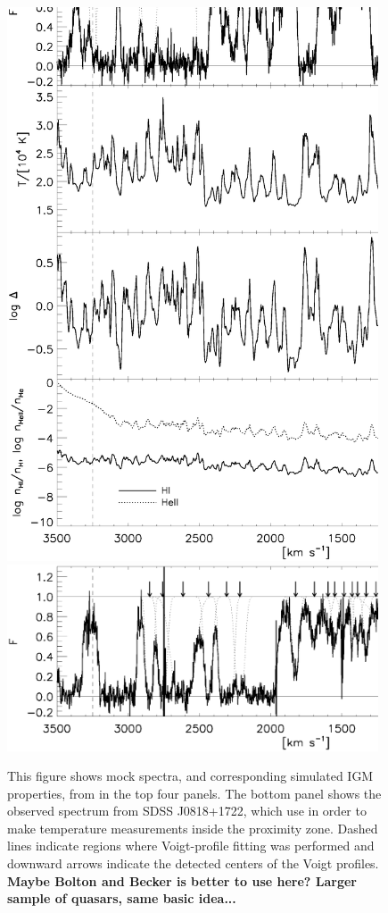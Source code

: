 \begin{figure}[h]
  \centering
  \includegraphics[width=11cm]{BoltonIGMTemperature_Fig2.ps}
  \includegraphics[width=11cm]{BoltonIGMTemperature_Fig2b.ps}
  \caption{This figure shows mock spectra, and corresponding simulated IGM properties, from \cite{BoltonQuasar} in the top four panels. The bottom panel shows the observed spectrum from SDSS J0818+1722, which \cite{BoltonQuasar} use in order to make temperature measurements inside the proximity zone. Dashed lines indicate regions where Voigt-profile fitting was performed and downward arrows indicate the detected centers of the Voigt profiles. {\bf Maybe Bolton and Becker is better to use here? Larger sample of quasars, same basic idea...}}
  \label{fig:QuasarProximityTemp}
\end{figure}


